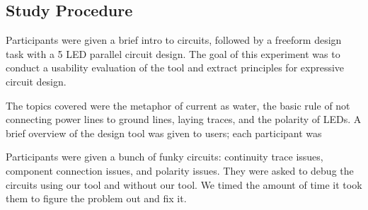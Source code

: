 \documentclass{sigchi}
\begin{document}
\subsection{Study Procedure}
Participants were given a brief intro to circuits, followed by a freeform design task with a 5 LED parallel circuit design. The goal of this experiment was to conduct a usability evaluation of the tool and extract principles for expressive circuit design. 

The topics covered were the metaphor of current as water, the basic rule of not connecting power lines to ground lines, laying traces, and the polarity of LEDs. A brief overview of the design tool was given to users; each participant was

Participants were given a bunch of funky circuits: continuity trace issues, component connection issues, and polarity issues. They were asked to debug the circuits using our tool and without our tool. We timed the amount of time it took them to figure the problem out and fix it. 
\end{document}
